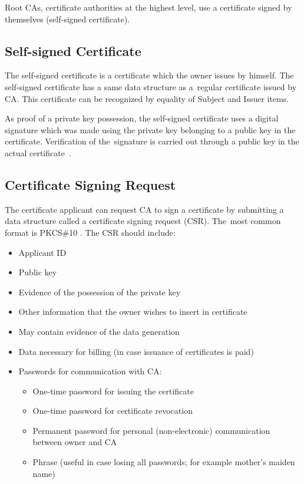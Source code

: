 \documentclass[
  12pt, 
  digital, %
  notable,   %
  nolof,     %
  nolot,     %
]{fithesis3}
\begin{document}
Root CAs, certificate authorities at the highest level, use a certificate signed by themselves 
(self-signed certificate).

\subsection{Self-signed Certificate}
The self-signed certificate is a certificate which the owner issues by himself. The self-signed 
certificate has a same data structure as a~regular certificate issued by CA. This certificate can 
be recognized by equality of Subject and Issuer items.

As proof of a private key possession, the self-signed certificate uses a digital signature which 
was made using the private key belonging to a public key in the certificate. Verification of 
the~signature is carried out through a public key in the actual 
certificate~\cite{dostalek2016velky}.

\subsection{Certificate Signing Request}
The certificate applicant can request CA to sign a certificate by submitting a data structure called 
a certificate signing request (CSR). The~most common format is PKCS\#10 \cite{dostalek2016velky}. The 
CSR should include:
\begin{itemize}[leftmargin=2em,rightmargin=1em,itemsep=0.75\parskip,parsep=0em,topsep=0em,partopsep=0em]
\item Applicant ID
\item Public key
\item Evidence of the possession of the private key
\item Other information that the owner wishes to insert in certificate
\item May contain evidence of the data generation
\item Data necessary for billing (in case issuance of certificates is paid)
\item Passwords for communication with CA:
  \begin{itemize}[leftmargin=2em,rightmargin=1em,itemsep=0.75\parskip,parsep=0em,topsep=0em,partopsep=0em]
  \item One-time password for issuing the certificate
  \item One-time password for certificate revocation
  \item Permanent password for personal (non-electronic) communication between owner and CA
  \item Phrase (useful in case losing all passwords; for example mother's maiden name) 
  \end{itemize}
\end{itemize} 
\end{document}
